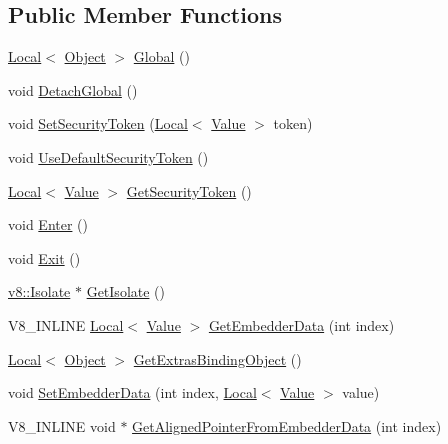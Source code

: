 \subsection*{Public Member Functions}
\begin{DoxyCompactItemize}
\item 
\hyperlink{classv8_1_1_local}{Local}$<$ \hyperlink{classv8_1_1_object}{Object} $>$ \hyperlink{classv8_1_1_context_af5cd9f97ef6a3307c1c21f80f4b743eb}{Global} ()
\item 
void \hyperlink{classv8_1_1_context_a841c7dd92eb8c57df92a268a164dea97}{Detach\+Global} ()
\item 
void \hyperlink{classv8_1_1_context_a2351d9bdf4450d5f23734033289ba3ab}{Set\+Security\+Token} (\hyperlink{classv8_1_1_local}{Local}$<$ \hyperlink{classv8_1_1_value}{Value} $>$ token)
\item 
void \hyperlink{classv8_1_1_context_aa9e1a14982b64fd51ab87600a287bad2}{Use\+Default\+Security\+Token} ()
\item 
\hyperlink{classv8_1_1_local}{Local}$<$ \hyperlink{classv8_1_1_value}{Value} $>$ \hyperlink{classv8_1_1_context_a59d7bc98684603ec4d9b1d1db2acaad8}{Get\+Security\+Token} ()
\item 
void \hyperlink{classv8_1_1_context_a6995c49d9897eb49053f07874b825133}{Enter} ()
\item 
void \hyperlink{classv8_1_1_context_a2db09d4fefb26023a40d88972a4c1599}{Exit} ()
\item 
\hyperlink{classv8_1_1_isolate}{v8\+::\+Isolate} $\ast$ \hyperlink{classv8_1_1_context_af55552d8658ecb20eff7af2c83e8ede2}{Get\+Isolate} ()
\item 
V8\+\_\+\+I\+N\+L\+I\+NE \hyperlink{classv8_1_1_local}{Local}$<$ \hyperlink{classv8_1_1_value}{Value} $>$ \hyperlink{classv8_1_1_context_a9cfafe0ac56f6aee17eb80a913489296}{Get\+Embedder\+Data} (int index)
\item 
\hyperlink{classv8_1_1_local}{Local}$<$ \hyperlink{classv8_1_1_object}{Object} $>$ \hyperlink{classv8_1_1_context_aa06026c0a9dc43874b437675b8fd0059}{Get\+Extras\+Binding\+Object} ()
\item 
void \hyperlink{classv8_1_1_context_a1f2f3da0b9c3d9b68a5384b757d607d2}{Set\+Embedder\+Data} (int index, \hyperlink{classv8_1_1_local}{Local}$<$ \hyperlink{classv8_1_1_value}{Value} $>$ value)
\item 
V8\+\_\+\+I\+N\+L\+I\+NE void $\ast$ \hyperlink{classv8_1_1_context_aa3b5c1a1a5d145c6096840898013f559}{Get\+Aligned\+Pointer\+From\+Embedder\+Data} (int index)
\item 

\end{DoxyCompactItemize}
